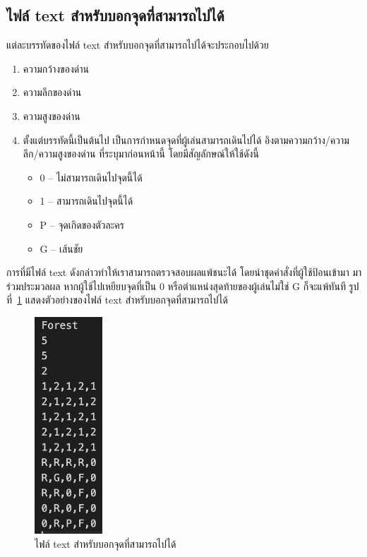 \subsection{ไฟล์ text สำหรับบอกจุดที่สามารถไปได้}
แต่ละบรรทัดของไฟล์ text สำหรับบอกจุดที่สามารถไปได้จะประกอบไปด้วย
\begin{enumerate}
    \item ความกว้างของด่าน
    \item ความลึกของด่าน
    \item ความสูงของด่าน
    \item ตั้งแต่บรรทัดนี้เป็นต้นไป เป็นการกำหนดจุดที่ผู้เล่นสามารถเดินไปได้ อิงตามความกว้าง/ความลึก/ความสูงของด่าน ที่ระบุมาก่อนหน้านี้ โดยมีสัญลักษณ์ให้ใช้ดังนี้
    \begin{itemize}
        \item 0 -- ไม่สามารถเดินไปจุดนี้ได้
        \item 1 -- สามารถเดินไปจุดนี้ได้
        \item P -- จุดเกิดของตัวละคร
        \item G -- เส้นชัย
    \end{itemize}
\end{enumerate}
การที่มีไฟล์ text ดังกล่าวทำให้เราสามารถตรวจสอบผลแพ้ชนะได้ โดยนำชุดคำสั่งที่ผู้ใช้ป้อนเข้ามา มาร่วมประมวลผล หากผู้ใช้ไปเหยียบจุดที่เป็น 0
หรือตำแหน่งสุดท้ายของผู้เล่นไม่ใช่ G ก็จะแพ้ทันที รูปที่~\ref{ft2} แสดงตัวอย่างของไฟล์ text สำหรับบอกจุดที่สามารถไปได้
\begin{figure}[h!]
    \begin{center}
    \includegraphics[width=1in]{pic-toro/filetext2.png}
    \end{center}
    \caption[ไฟล์ text สำหรับบอกจุดที่สามารถไปได้]{ไฟล์ text สำหรับบอกจุดที่สามารถไปได้}
    \label{ft2}
    \end{figure}
